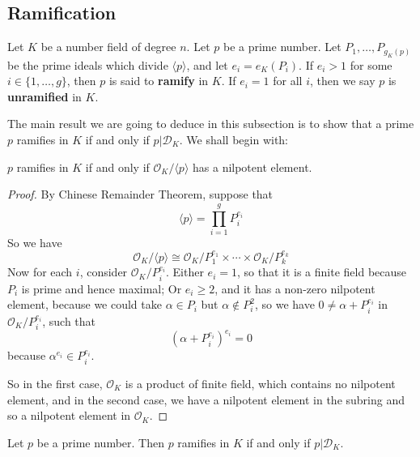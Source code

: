 \subsection{Ramification}
\begin{definition} Let $K$ be a number field of degree $n$. Let $p$ be a prime number. Let $P_1,\ldots,P_{g_K(p)}$ be the prime ideals which divide $\langle p \rangle$, and let $e_i=e_K(P_i)$.
If $e_i >1$ for some $i \in \{1,\ldots,g\}$, then $p$ is said to {\bf ramify} in $K$. If $e_i=1$ for all $i$, then
we say $p$ is {\bf unramified} in $K$.
\end{definition}
The main result we are going to deduce in this subsection is to show that a prime $p$ ramifies in $K$ if and only if $p |\mathcal{D}_K$. We shall begin with:
\begin{theorem} $p$ ramifies in $K$ if and only if $\mathcal{O}_K/\langle p \rangle$ has a nilpotent element.
\end{theorem}
\begin{proof}
By Chinese Remainder Theorem, suppose that
$$\langle p \rangle=\prod_{i=1}^g P^{e_i}_i$$
So we have
$$\mathcal{O}_K/\langle p \rangle \cong \mathcal{O}_K/P^{e_1}_1 \times \cdots \times \mathcal{O}_K/P^{e_k}_k$$
Now for each $i$, consider $\mathcal{O}_K/P^{e_i}_i$. Either $e_i=1$, so that it is a finite field because $P_i$
is prime and hence maximal; Or $e_i \ge 2$, and it has a non-zero nilpotent element, because we could take
$\alpha \in P_i$ but $\alpha \not \in P^2_i$, so we have $0 \neq \alpha+P^{e_i}_i$ in $\mathcal{O}_K/P^{e_i}_i$,
such that
$$(\alpha+P^{e_i}_i)^{e_i}=0$$ because $\alpha^{e_i} \in P^{e_i}_i$.

So in the first case, $\mathcal{O}_K$ is a product of finite field, which contains no nilpotent element, and in the second case, we have a nilpotent element in the subring and so a nilpotent element in $\mathcal{O}_K$.
\end{proof}
\begin{theorem} Let $p$ be a prime number. Then $p$ ramifies in $K$ if and only if $p|\mathcal{D}_K$.
\end{theorem}
